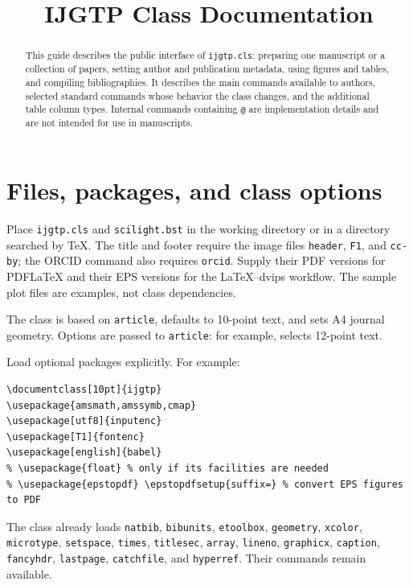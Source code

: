 \documentclass[10pt]{ijgtp}
\newcommand{\cmd}[1]{\texttt{\detokenize{#1}}}
\begin{document}
\title{IJGTP Class Documentation}
\begin{abstract}
This guide describes the public interface of \texttt{ijgtp.cls}: preparing
one manuscript or a collection of papers, setting author and publication
metadata, using figures and tables, and compiling bibliographies. It describes
the main commands available to authors, selected standard commands
whose behavior the class changes, and the additional table column types.
Internal commands containing \texttt{@} are implementation details and
are not intended for use in manuscripts.
\end{abstract}
\maketitle

\tableofcontents

\bigskip

\section{Files, packages, and class options}
\label{sec:setup}
Place \texttt{ijgtp.cls} and \texttt{scilight.bst} in the working directory
or in a directory searched by \TeX. The title and footer require the image
files \texttt{header}, \texttt{F1}, and \texttt{cc-by}; the ORCID command
also requires \texttt{orcid}. Supply their PDF versions for PDFLaTeX and
their EPS versions for the \LaTeX--dvips workflow. The sample plot files
are examples, not class dependencies.

The class is based on \texttt{article}, defaults to 10-point text, and
sets A4 journal geometry. Options are passed to \texttt{article}: for
example, \cmd{\documentclass[12pt]{ijgtp}} selects 12-point text.

Load optional packages explicitly. For example:
\begin{samepage}
\begin{verbatim}
\documentclass[10pt]{ijgtp}
\usepackage{amsmath,amssymb,cmap}
\usepackage[utf8]{inputenc}
\usepackage[T1]{fontenc}
\usepackage[english]{babel}
% \usepackage{float} % only if its facilities are needed
% \usepackage{epstopdf} \epstopdfsetup{suffix=} % convert EPS figures to PDF
\end{verbatim}
\end{samepage}

The class already loads \texttt{natbib}, \texttt{bibunits},
\texttt{etoolbox}, \texttt{geometry}, \texttt{xcolor},
\texttt{microtype}, \texttt{setspace}, \texttt{times},
\texttt{titlesec}, \texttt{array}, \texttt{lineno},
\texttt{graphicx}, \texttt{caption}, \texttt{fancyhdr},
\texttt{lastpage}, \texttt{catchfile}, and \texttt{hyperref}.
Their commands remain available.
\end{document}
